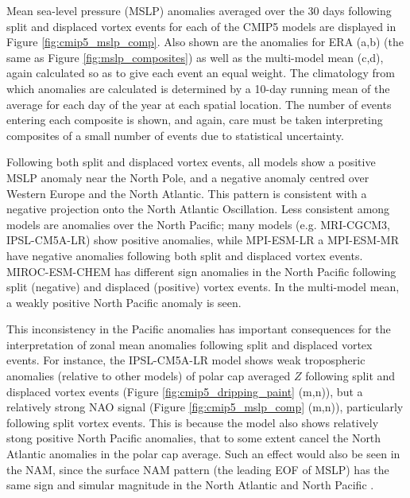 Mean sea-level pressure (MSLP) anomalies averaged over the 30 days following
split and displaced vortex events for each of the CMIP5 models are displayed in
Figure \ref{fig:cmip5_mslp_comp}. Also shown are the anomalies for ERA (a,b)
(the same as Figure \ref{fig:mslp_composites}) as well as the multi-model mean
(c,d), again calculated so as to give each event an equal weight. The
climatology from which anomalies are calculated is determined by a 10-day
running mean of the average for each day of the year at each spatial
location. The number of events entering each composite is shown, and again, care
must be taken interpreting composites of a small number of events due to
statistical uncertainty.

Following both split and displaced vortex events, all models show a positive
MSLP anomaly near the North Pole, and a negative anomaly centred over Western
Europe and the North Atlantic. This pattern is consistent with a negative
projection onto the North Atlantic Oscillation. Less consistent among models are
anomalies over the North Pacific; many models (e.g. MRI-CGCM3, IPSL-CM5A-LR)
show positive anomalies, while MPI-ESM-LR a MPI-ESM-MR have negative anomalies
following both split and displaced vortex events. MIROC-ESM-CHEM has different
sign anomalies in the North Pacific following split (negative) and displaced
(positive) vortex events. In the multi-model mean, a weakly positive North
Pacific anomaly is seen.

This inconsistency in the Pacific anomalies has important consequences for the
interpretation of zonal mean anomalies following split and displaced vortex
events. For instance, the IPSL-CM5A-LR model shows weak tropospheric anomalies
(relative to other models) of polar cap averaged $Z$ following split and
displaced vortex events (Figure \ref{fig:cmip5_dripping_paint} (m,n)), but a
relatively strong NAO signal (Figure \ref{fig:cmip5_mslp_comp} (m,n)),
particularly following split vortex events. This is because the model also shows
relatively stong positive North Pacific anomalies, that to some extent cancel
the North Atlantic anomalies in the polar cap average. Such an effect would also
be seen in the NAM, since the surface NAM pattern (the leading EOF of MSLP) has
the same sign and simular magnitude in the North Atlantic and North Pacific
\citep[e.g.,][]{Ambaum2001}. 

